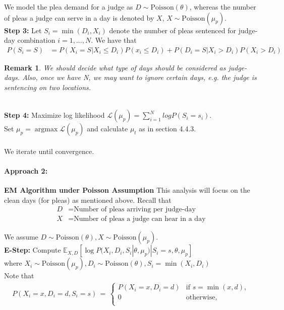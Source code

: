 \documentclass[11pt, oneside]{article}   	%
\theoremstyle{ModifiedStyle}
\newtheorem{remark}{Remark}
\DeclareMathOperator*{\argmax}{argmax}
\begin{document}
We model the plea demand for a judge as $D \sim \text{Poisson}(\theta)$, whereas the number of pleas a judge can serve in a day is denoted by $X$, $X \sim \text{Poisson}(\mu_p)$.\\

\noindent \textbf{Step 3:} Let $S_i = \min(D_i,X_i)$ denote the number of pleas sentenced for judge-day combination $i=1,...,N$. We have that
\begin{align*}
	P(S_i = S) &= P(X_i = S | X_i \leq D_i) P(x_i \leq D_i) + P(D_i = S | X_i > D_i) P(X_i > D_i)
\end{align*}

\begin{remark}
	We should decide what type of days should be considered as judge-days. Also, once we have N, we may want to ignore certain days, e.g. the judge is sentencing on two locations.
\end{remark} \\

\noindent \textbf{Step 4:} Maximize log likelihood $\mathscr{L}(\mu_p) = \sum_{i=1}^N log P(S_i = s_i)$. \\
Set $\mu_p = \argmax \mathscr{L}(\mu_p)$ and calculate $\mu_t$ as in section 4.4.3. \\
\\
We iterate until convergence.

\paragraph{Approach 2:} \textbf{EM Algorithm under Poisson Assumption} This analysis will focus on the clean days (for pleas) as mentioned above. Recall that \begin{align*}
	D &= \text{Number of pleas arriving per judge-day}\\
	X &= \text{Number of pleas a judge can hear in a day}
\end{align*}

We assume $D \sim \text{Poisson}(\theta), X \sim \text{Poisson}(\mu_p)$.\\
\textbf{E-Step:} Compute $\mathbb{E}_{X,D}[\log P(X_i,D_i,S_i|\theta,\mu_p)|S_i=s,\theta,\mu_p]$ \\
where $X_i \sim \text{Poisson}(\mu_p), D_i \sim \text{Poisson}(\theta), S_i = \min(X_i,D_i)$\\
Note that
\begin{align*}
P(X_i=x,D_i=d,S_i=s) \,=\, \left \{\!\! \begin{array}{ll}
P(X_i = x,D_i=d) & \text{if } s= \min(x,d), \\
0 & \text{otherwise}, \\
\end{array} \right.
\end{align*}
\end{document}
